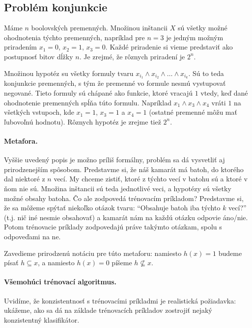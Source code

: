 \subsection{Problém konjunkcie}

Máme $n$ boolovských premenných. Množinou inštancii $X$ sú všetky
možné ohodnotenia týchto premenných, napríklad pre $n = 3$ je jedným
možným priradením $x_1 = 0$, $x_2 = 1$, $x_3 = 0$. Každé priradenie
si vieme predstaviť ako postupnosť bitov dĺžky $n$. Je zrejmé, že
rôznych priradení je $2^n$.

Množinou hypotéz su všetky formuly tvaru $x_{i_1} \land x_{i_2} \land \ldots \land x_{i_k}$.
Sú to teda konjunkcie premenných, s tým že premenné vo formule nesmú
vystupovať negované. Tieto formuly sú chápané ako funkcie, ktoré
vracajú $1$ vtedy, keď dané ohodnotenie premenných spĺňa túto formulu.
Napríklad $x_1 \land x_3 \land x_4$ vráti $1$ na všetkých vstupoch,
kde $x_1 = 1$, $x_3 = 1$ a $x_4 = 1$ (ostatné premenné môžu mať
ľubovoľnú hodnotu). Rôznych hypotéz je zrejme tiež $2^n$.

\paragraph{Metafora.} Vyššie uvedený popis je možno príliš formálny, 
problém sa dá vysvetliť aj prirodzenejším spôsobom. Predstavme
si, že náš kamarát má batoh, do ktorého dal niektoré z $n$ vecí.
My chceme zistiť, ktoré z týchto vecí v batohu sú a ktoré v ňom
nie sú. Množina inštancii sú teda jednotlivé veci, a hypotézy sú
všetky možné obsahy batoha. Čo ale zodpovedá trénovacím príkladom?
Predstavme si, že sa môžeme spýtať niekoľko otázok tvaru: ``Obsahuje
batoh iba týchto $k$ vecí?'' (t.j. nič iné nesmie obsahovať) a kamarát
nám na každú otázku odpovie áno/nie. Potom trénovacie príklady
zodpovedajú práve takýmto otázkam, spolu s odpoveďami na ne.

Zavedieme prirodzenú notáciu pre túto metaforu: namiesto $h(x) = 1$
budeme písať $h \subseteq x$, a namiesto $h(x) = 0$ píšeme $h \not\subseteq x$.

\paragraph{Všemohúci trénovací algoritmus.} Uvidíme, že konzistentnosť
s trénovacími príkladmi je realistická požiadavka: ukážeme, ako sa
dá na základe trénovacích príkladov zostrojiť nejaký konzistentný
klasifikátor.

